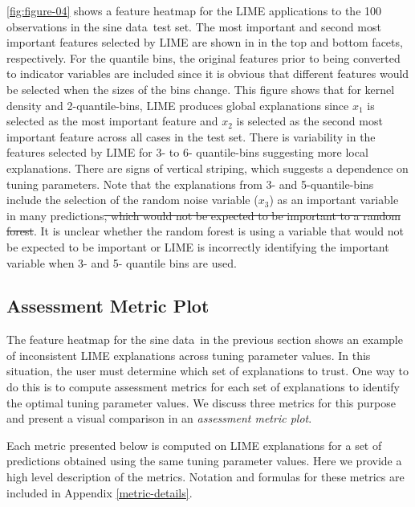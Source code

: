 \documentclass[AMS,STIX2COL]{WileyNJD-v2}\usepackage[]{graphicx}\usepackage[]{color}
\newcommand{\data}{sine data}
\begin{document}
\autoref{fig:figure-04} shows a feature heatmap for the LIME applications to the 100 observations in the \data \ test set. The most important and second most important features selected by LIME are shown in in the top and bottom facets, respectively. For the quantile bins, the original features prior to being converted to indicator variables are included since it is obvious that different features would be selected when the sizes of the bins change. This figure shows that for kernel density and 2-quantile-bins, LIME produces global explanations since $x_1$ is selected as the most important feature and $x_2$ is selected as the second most important feature across all cases in the test set. There is variability in the features selected by LIME for 3- to 6- quantile-bins suggesting more local explanations. There are signs of vertical striping, which suggests a dependence on tuning parameters. Note that the explanations from 3- and 5-quantile-bins include the selection of the random noise variable ($x_3$) as an important variable in many predictions\sout{, which would not be expected to be important to a random forest}. It is unclear whether the random forest is using a variable that would not be expected to be important or LIME is incorrectly identifying the important variable when 3- and 5- quantile bins are used.

\subsection{Assessment Metric Plot} \label{assess-metric}

The feature heatmap for the \data \ in the previous section shows an example of inconsistent LIME explanations across tuning parameter values. In this situation, the user must determine which set of explanations to trust. One way to do this is to compute assessment metrics for each set of explanations to identify the optimal tuning parameter values. We discuss three metrics for this purpose and present a visual comparison in an \emph{assessment metric plot}.

Each metric presented below is computed on LIME explanations for a set of predictions obtained using the same tuning parameter values. Here we provide a high level description of the metrics. Notation and formulas for these metrics are included in Appendix \ref{metric-details}.
\end{document}
